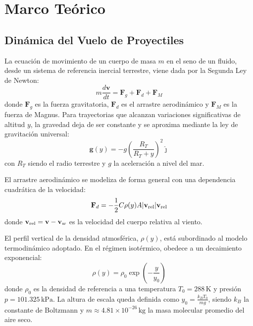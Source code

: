 \section{Marco Teórico}

\subsection{Dinámica del Vuelo de Proyectiles}
La ecuación de movimiento de un cuerpo de masa $m$ en el seno de un fluido, desde un sistema de referencia inercial terrestre, viene dada por la Segunda Ley de Newton:
\begin{equation}
    m \frac{d\mathbf{v}}{dt} = \mathbf{F}_g + \mathbf{F}_d + \mathbf{F}_M
\end{equation}
donde $\mathbf{F}_g$ es la fuerza gravitatoria, $\mathbf{F}_d$ es el arrastre aerodinámico y $\mathbf{F}_M$ es la fuerza de Magnus. Para trayectorias que alcanzan variaciones significativas de altitud $y$, la gravedad deja de ser constante y se aproxima mediante la ley de gravitación universal:
\begin{equation}
    \mathbf{g}(y) = -g \left( \frac{R_T}{R_T + y} \right)^2 \hat{\jmath}
\end{equation}
con $R_T$ siendo el radio terrestre y $g$ la aceleración a nivel del mar.

El arrastre aerodinámico se modeliza de forma general con una dependencia cuadrática de la velocidad:
\begin{equation}
    \mathbf{F}_d = - \frac{1}{2} C \rho(y) A |\mathbf{v}_{\rm rel}| \mathbf{v}_{\rm rel} 
\end{equation}
donde $\mathbf{v}_{\rm rel} = \mathbf{v} - \mathbf{v}_w$ es la velocidad del cuerpo relativa al viento.


El perfil vertical de la densidad atmosférica, $\rho(y)$, está subordinado al modelo termodinámico adoptado. En el régimen isotérmico, obedece a un decaimiento exponencial:
\begin{equation}
    \rho(y) = \rho_0 \exp\left(-\frac{y}{y_0}\right)
\end{equation}
donde $\rho_0$ es la densidad de referencia a una temperatura $T_0 = 288\mathrm{\,K}$ y presión $p = 101.325\mathrm{\,kPa}$. La altura de escala queda definida como $y_0 = \frac{k_B T_0}{m g}$, siendo $k_B$ la constante de Boltzmann y $m \approx 4.81 \times 10^{-26}\mathrm{\,kg}$ la masa molecular promedio del aire seco.

